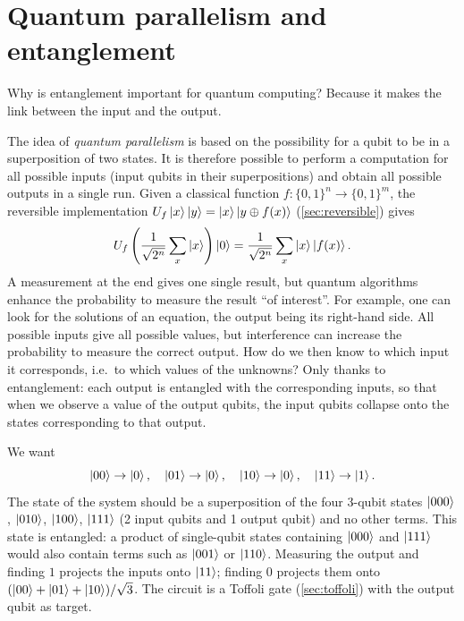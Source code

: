 \section{Quantum parallelism and entanglement}\label{sec:parallelism}
Why is entanglement important for quantum computing? Because it makes the link between the input and the output.

The idea of \emph{quantum parallelism} is based on the possibility for a qubit to be in a superposition of two states. It is therefore possible to perform a
computation for all possible inputs (input qubits in their superpositions) and obtain all possible outputs in a single run. Given a classical function
$f:\{0,1\}^n\to\{0,1\}^m$, the reversible implementation $U_f\left|x\right\rangle\left|y\right\rangle=\left|x\right\rangle\left|y\oplus f(x)\right\rangle$ (\cref{sec:reversible}) gives
\begin{equation}
  U_f\left(\frac1{\sqrt{2^n}}\sum_x\left|x\right\rangle\right)\left|0\right\rangle=\frac1{\sqrt{2^n}}\sum_x\left|x\right\rangle\left|f(x)\right\rangle.
\end{equation}
A measurement at the end gives one single result, but quantum algorithms enhance the probability to measure the result ``of interest''. For example, one can look
for the solutions of an equation, the output being its right-hand side. All possible inputs give all possible values, but interference can increase the probability
to measure the correct output. How do we then know to which input it corresponds, i.e.\ to which values of the unknowns? Only thanks to entanglement: each output
is entangled with the corresponding inputs, so that when we observe a value of the output qubits, the input qubits collapse onto the states corresponding to that output.

\begin{example}
We want
\begin{equation}
  \left|00\right\rangle\to\left|0\right\rangle,\quad\left|01\right\rangle\to\left|0\right\rangle,\quad\left|10\right\rangle\to\left|0\right\rangle,\quad\left|11\right\rangle\to\left|1\right\rangle .
\end{equation}
The state of the system should be a superposition of the four 3-qubit states $\left|000\right\rangle$, $\left|010\right\rangle$, $\left|100\right\rangle$, $\left|111\right\rangle$ (2 input qubits and 1 output qubit)
and no other terms. This state is entangled: a product of single-qubit states containing $\left|000\right\rangle$ and $\left|111\right\rangle$ would also contain terms such as $\left|001\right\rangle$ or
$\left|110\right\rangle$. Measuring the output and finding $1$ projects the inputs onto $\left|11\right\rangle$; finding $0$ projects them onto $(\left|00\right\rangle+\left|01\right\rangle+\left|10\right\rangle)/\sqrt3$.
The circuit is a Toffoli gate (\cref{sec:toffoli}) with the output qubit as target.
\end{example}

